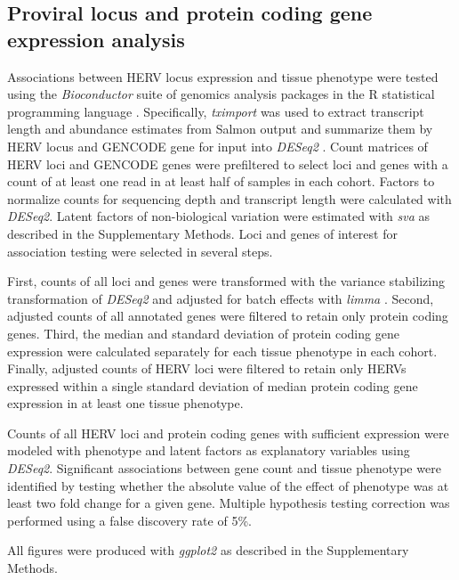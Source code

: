 \subsection*{Proviral locus and protein coding gene expression analysis}
Associations between HERV locus expression and tissue phenotype were tested using the \emph{Bioconductor} suite of genomics analysis packages \citep{bioc} in the R statistical programming language \citep{R}.
Specifically, \emph{tximport} \citep{Soneson2015} was used to extract transcript length and abundance estimates from Salmon output and summarize them by HERV locus and GENCODE gene for input into \emph{DESeq2} \citep{Love2014}.
Count matrices of HERV loci and GENCODE genes were prefiltered to select loci and genes with a count of at least one read in at least half of samples in each cohort.
Factors to normalize counts for sequencing depth and transcript length were calculated with \emph{DESeq2}.
Latent factors of non-biological variation were estimated with \emph{sva} \citep{sva} as described in the Supplementary Methods.
Loci and genes of interest for association testing were selected in several steps.

First, counts of all loci and genes were transformed with the variance stabilizing transformation of \emph{DESeq2} and adjusted for batch effects with \emph{limma} \citep{Ritchie2015}.
Second, adjusted counts of all annotated genes were filtered to retain only protein coding genes.
Third, the median and standard deviation of protein coding gene expression were calculated separately for each tissue phenotype in each cohort.
Finally, adjusted counts of HERV loci were filtered to retain only HERVs expressed within a single standard deviation of median protein coding gene expression in at least one tissue phenotype.

Counts of all HERV loci and protein coding genes with sufficient expression were modeled with phenotype and latent factors as explanatory variables using \emph{DESeq2}.
Significant associations between gene count and tissue phenotype were identified by testing whether the absolute value of the effect of phenotype was at least two fold change for a given gene.
Multiple hypothesis testing correction was performed using a false discovery rate of 5\%.

All figures were produced with \emph{ggplot2} \citep{Wickham2016} as described in the Supplementary Methods.
